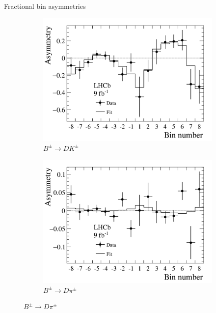 \documentclass{beamer}
\begin{document}
\begin{frame}{Fractional bin asymmetries}
  \begin{figure}
    \centering
    \vspace{-0.2cm}
    \begin{subfigure}{0.5\textwidth}
      \includegraphics[width = 1.0\textwidth]{Plots/BinAsymmetries_dk.png}
      \caption{$B^\pm\to DK^\pm$}
    \end{subfigure}%
    \begin{subfigure}{0.5\textwidth}
      \includegraphics[width = 1.0\textwidth]{Plots/BinAsymmetries_dpi.png}
      \caption{$B^\pm\to D\pi^\pm$}
    \end{subfigure}
  \end{figure}
\end{frame}
\end{document}
